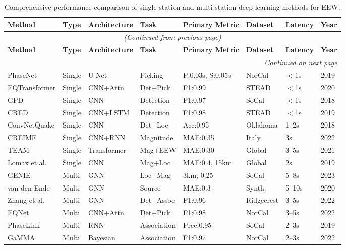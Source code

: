 \documentclass[review,authoryear]{elsarticle}
\begin{document}
\begin{longtable}{p{2.2cm}p{1.2cm}p{1.8cm}p{1.5cm}p{1.5cm}p{1.3cm}p{1.0cm}p{1.0cm}}
\caption{Comprehensive performance comparison of single-station and multi-station deep learning methods for EEW.} \label{tab:comprehensive_comparison} \\
\toprule
\textbf{Method} & \textbf{Type} & \textbf{Architecture} & \textbf{Task} & \textbf{Primary Metric} & \textbf{Dataset} & \textbf{Latency} & \textbf{Year} \\
\midrule
\endfirsthead
\multicolumn{8}{c}{\textit{(Continued from previous page)}} \\
\toprule
\textbf{Method} & \textbf{Type} & \textbf{Architecture} & \textbf{Task} & \textbf{Primary Metric} & \textbf{Dataset} & \textbf{Latency} & \textbf{Year} \\
\midrule
\endhead
\midrule
\multicolumn{8}{r}{\textit{Continued on next page}} \\
\endfoot
\bottomrule
\endlastfoot
PhaseNet & Single & U-Net & Picking & P:0.03s, S:0.05s & NorCal & $<$1s & 2019 \\
EQTransformer & Single & CNN+Attn & Det+Pick & F1:0.99 & STEAD & $<$1s & 2020 \\
GPD & Single & CNN & Detection & F1:0.97 & SoCal & $<$1s & 2018 \\
CRED & Single & CNN+LSTM & Detection & F1:0.98 & STEAD & $<$1s & 2019 \\
ConvNetQuake & Single & CNN & Det+Loc & Acc:0.95 & Oklahoma & 1--2s & 2018 \\
CREIME & Single & CNN+RNN & Magnitude & MAE:0.35 & Italy & 3s & 2022 \\
TEAM & Single & Transformer & Mag+EEW & MAE:0.30 & Global & 3--5s & 2021 \\
Lomax et al. & Single & CNN & Mag+Loc & MAE:0.4, 15km & Global & 2s & 2019 \\
\midrule
GENIE & Multi & GNN & Loc+Mag & 3km, 0.25 & SoCal & 5--8s & 2023 \\
van den Ende & Multi & GNN & Source & MAE:0.3 & Synth. & 5--10s & 2020 \\
Zhang et al. & Multi & GNN & Det+Assoc & F1:0.96 & Ridgecrest & 3--5s & 2022 \\
EQNet & Multi & CNN+Attn & Det+Pick & F1:0.98 & NorCal & 3--5s & 2022 \\
PhaseLink & Multi & RNN & Association & Prec:0.95 & SoCal & 2--3s & 2019 \\
GaMMA & Multi & Bayesian & Association & F1:0.97 & NorCal & 2--3s & 2022 \\

\end{longtable}
\end{document}
